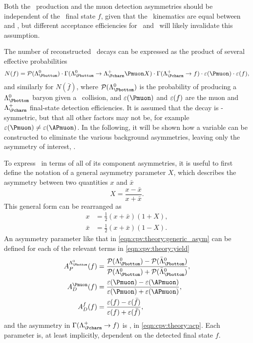Both the \PLambdab\ production and the muon detection asymmetries should be 
independent of the \PLambdac\ final state $f$, given that the \PLambdac\ 
kinematics are equal between \pKK and \ppipi, but different acceptance 
efficiencies for \pKK\ and \ppipi\ will likely invalidate this assumption.

The number of reconstructed \LcTof\ decays can be expressed as the product of 
several effective probabilities
\begin{equation}
  N(f) = \prob(\PLambdab)\cdot
         \Gamma(\LbToLcmuX)\cdot
         \Gamma(\LcTof)\cdot
         \eff(\Pmuon)\cdot
         \eff(f),
  \label{eqn:cpv:theory:yield}
\end{equation}
and similarly for $N(\bar{f})$, where $\prob(\PLambdab)$ is the probability of 
producing a $\PLambdab$ baryon given a \pp\ collision, and $\eff(\Pmuon)$ and 
$\varepsilon(f)$ are the muon and $\PLambdac$ final-state detection efficiencies.
It is assumed that the \LbToLcmuX decay is \CP-symmetric, but that all other 
factors may not be, for example $\eff(\Pmuon) \neq \eff(\APmuon)$.
In the following, it will be shown how a variable can be constructed to 
eliminate the various background asymmetries, leaving only the asymmetry of 
interest, \ACP\@.

To express \ARaw\ in terms of all of its component asymmetries, it is useful to 
first define the notation of a general asymmetry parameter $X$, which describes 
the asymmetry between two quantities $x$ and $\bar{x}$
\begin{equation}
  X = \frac{x - \bar{x}}{x + \bar{x}}.
  \label{eqn:cpv:theory:generic_asym}
\end{equation}
This general form can be rearranged as
\begin{align}
  x &= \frac{1}{2}(x + \bar{x})(1 + X),\label{eqn:cpv:theory:asym_form_one}\\
  \bar{x} &= \frac{1}{2}(x + \bar{x})(1 - X).\label{eqn:cpv:theory:asym_form_two}
\end{align}
An asymmetry parameter like that in \cref{eqn:cpv:theory:generic_asym} can be defined for each of the relevant terms in 
\cref{eqn:cpv:theory:yield}
\begin{align*}
  \APLb(f) &= \frac{%
    \prob(\PLambdab) - \prob(\APLambdab)
  }{%
    \prob(\PLambdab) + \prob(\APLambdab)
  },\\
  \ADmu(f) &= \frac{%
    \eff(\Pmuon) - \eff(\APmuon)
  }{%
    \eff(\Pmuon) + \eff(\APmuon)
  },\\
  \ADf(f)  &= \frac{%
    \eff(f) - \eff(\bar{f})
  }{%
    \eff(f) + \eff(\bar{f})
  },
\end{align*}
and the asymmetry in $\Gamma(\LcTof)$ is \ACP, in \cref{eqn:cpv:theory:acp}.
Each parameter is, at least implicitly, dependent on the detected final state 
$f$.

